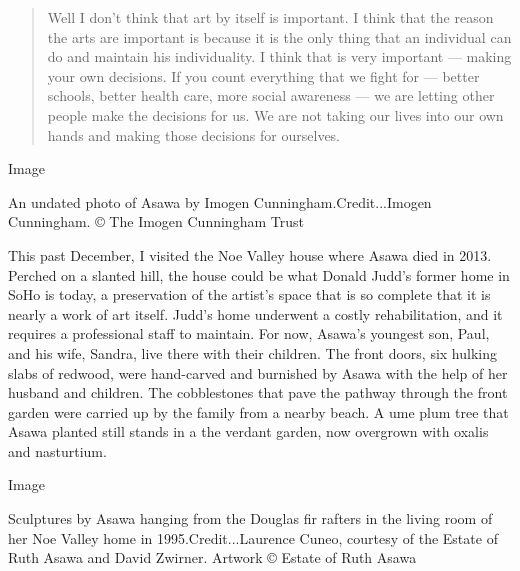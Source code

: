 \begin{quote}
Well I don't think that art by itself is important. I think that the
reason the arts are important is because it is the only thing that an
individual can do and maintain his individuality. I think that is very
important --- making your own decisions. If you count everything that we
fight for --- better schools, better health care, more social awareness
--- we are letting other people make the decisions for us. We are not
taking our lives into our own hands and making those decisions for
ourselves.
\end{quote}

Image

An undated photo of Asawa by Imogen Cunningham.Credit...Imogen
Cunningham. © The Imogen Cunningham Trust

This past December, I visited the Noe Valley house where Asawa died in
2013. Perched on a slanted hill, the house could be what Donald Judd's
former home in SoHo is today, a preservation of the artist's space that
is so complete that it is nearly a work of art itself. Judd's home
underwent a costly rehabilitation, and it requires a professional staff
to maintain. For now, Asawa's youngest son, Paul, and his wife, Sandra,
live there with their children. The front doors, six hulking slabs of
redwood, were hand-carved and burnished by Asawa with the help of her
husband and children. The cobblestones that pave the pathway through the
front garden were carried up by the family from a nearby beach. A ume
plum tree that Asawa planted still stands in a the verdant garden, now
overgrown with oxalis and nasturtium.

Image

Sculptures by Asawa hanging from the Douglas fir rafters in the living
room of her Noe Valley home in 1995.Credit...Laurence Cuneo, courtesy of
the Estate of Ruth Asawa and David Zwirner. Artwork © Estate of Ruth
Asawa

